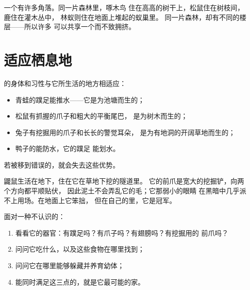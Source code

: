 \begin{remark}\label{rem:g2:where-animals-live:layers}
一个有许多角落。同一片森林里，啄木鸟
住在高高的树干上，松鼠住在树枝间，鹿住在灌木丛中，
林蚁则住在地面上堆起的蚁巢里。
同一片森林，却有不同的楼层——所以许多
可以共享一个而不致拥挤。
\end{remark}

\section{适应栖息地}

\begin{proposition}[动物与栖息地相适应]\label{prop:g2:where-animals-live:fit}
的身体和习性与它所生活的地方相适应：
\begin{itemize}
  \item 青蛙的蹼足能推水——它是为池塘而生的；
  \item 松鼠有抓握的爪子和粗大的平衡尾巴，
        是为树木而生的；
  \item 兔子有挖掘用的爪子和长长的警觉耳朵，
        是为有地洞的开阔草地而生的；
  \item 鸭子的能防水，它的蹼足
        能划水。
\end{itemize}
若被移到错误的，就会失去这些优势。
\end{proposition}
\admitted

\begin{example}[鼹鼠的本领]\label{ex:g2:where-animals-live:mole}
鼹鼠生活在地下，住在它在草地下挖的隧道里。
它的前爪是宽大的挖掘铲，向两个方向都平顺贴伏，
因此泥土不会弄乱它的毛；它那弱小的眼睛
在黑暗中几乎派不上用场。在地面上它笨拙，
但在自己的里，它是冠军。
\end{example}

\begin{method}[为动物匹配栖息地]\label{met:g2:where-animals-live:matching}
面对一种不认识的：
\begin{enumerate}
  \item 看看它的器官：有蹼足吗？有爪子吗？有翅膀吗？有挖掘用的
        前爪吗？
  \item 问问它吃什么，以及这些食物在哪里找到；
  \item 问问它在哪里能够躲藏并养育幼体；
  \item 能同时满足这三点的，就是它最可能的家。
\end{enumerate}
\end{method}

